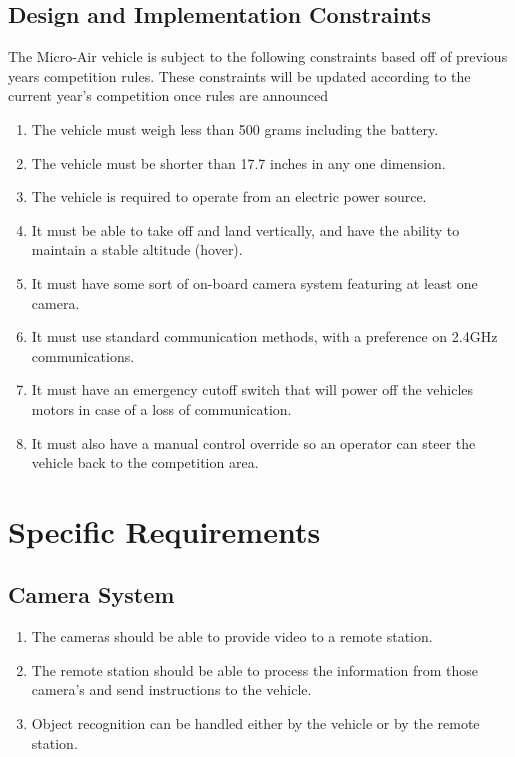 \documentclass[letterpaper, 10, draftclsnofoot, onecolumn]{IEEEtran}
\begin{document}
\subsection{Design and Implementation Constraints}

The Micro-Air vehicle is subject to the following constraints based off of previous years competition rules.\cite{r2} These constraints will be updated according to the current year’s competition once rules are announced
\begin{enumerate}
\item The vehicle must weigh less than 500 grams including the battery.
\item The vehicle must be shorter than 17.7 inches in any one dimension. 
\item The vehicle is required to operate from an electric power source.
\item It must be able to take off and land vertically, and have the ability to maintain a stable altitude (hover).
\item It must have some sort of on-board camera system featuring at least one camera.
\item It must use standard communication methods, with a preference on 2.4GHz communications.
\item It must have an emergency cutoff switch that will power off the vehicles motors in case of a loss of communication.
\item It must also have a manual control override so an operator can steer the vehicle back to the competition area. 
\end{enumerate}








\section{Specific Requirements}
\subsection{Camera System}
\begin{enumerate}
\item The cameras should be able to provide video to a remote station. 

\item The remote station should be able to process the information from those camera’s and send instructions to the vehicle. 

\item Object recognition can be handled either by the vehicle or by the remote station.

\end{enumerate}
\end{document}
